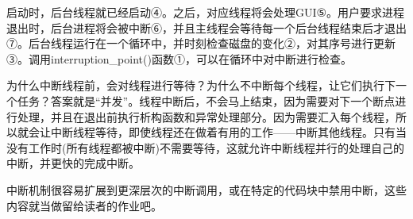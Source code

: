 启动时，后台线程就已经启动④。之后，对应线程将会处理GUI⑤。用户要求进程退出时，后台进程将会被中断⑥，并且主线程会等待每一个后台线程结束后才退出⑦。后台线程运行在一个循环中，并时刻检查磁盘的变化②，对其序号进行更新③。调用interruption\_point()函数①，可以在循环中对中断进行检查。

为什么中断线程前，会对线程进行等待？为什么不中断每个线程，让它们执行下一个任务？答案就是“并发”。线程中断后，不会马上结束，因为需要对下一个断点进行处理，并且在退出前执行析构函数和异常处理部分。因为需要汇入每个线程，所以就会让中断线程等待，即使线程还在做着有用的工作——中断其他线程。只有当没有工作时(所有线程都被中断)不需要等待，这就允许中断线程并行的处理自己的中断，并更快的完成中断。

中断机制很容易扩展到更深层次的中断调用，或在特定的代码块中禁用中断，这些内容就当做留给读者的作业吧。


